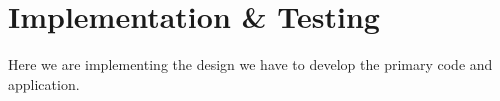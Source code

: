 \chapter{Implementation \& Testing}
\label{chap:implementation-testing}

Here we are implementing the design we have to develop the primary code and application.
